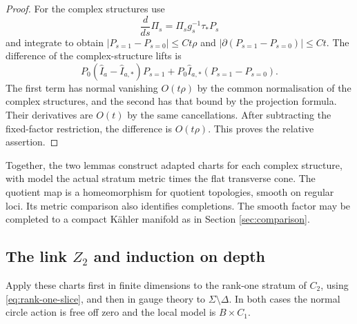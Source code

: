 \begin{proof}
For the complex structures use
\[
 \frac{d}{ds}\Pi_s=\Pi_sg_s^{-1}\tau_*P_s
\]
and integrate to obtain
$|P_{s=1}-P_{s=0}|\le Ct\rho$ and
$|\partial(P_{s=1}-P_{s=0})|\le Ct$. The difference of
the complex-structure lifts is
\[
 P_0(\widehat I_a-\widehat I_{a,*})P_{s=1}
       +P_0\widehat I_{a,*}(P_{s=1}-P_{s=0}).
\]
The first term has normal vanishing $O(t\rho)$ by the
common normalisation of the complex structures, and the second
has that bound by the projection formula. Their derivatives are
$O(t)$ by the same cancellations. After subtracting the
fixed-factor restriction, the difference is $O(t\rho)$.
This proves the relative assertion.
\end{proof}

Together, the two lemmas construct adapted charts for each complex
structure, with model the actual stratum metric times the flat
transverse cone. The quotient map is a homeomorphism for quotient
topologies, smooth on regular loci. Its metric comparison also
identifies completions. The smooth factor may be completed to a
compact K\"ahler manifold as in Section \ref{sec:comparison}.

\subsection{The link $Z_2$ and induction on depth}\label{ss:link-induction}
Apply these charts first in finite dimensions to the rank-one
stratum of $C_2$, using \eqref{eq:rank-one-slice}, and then in
gauge theory to $\Sigma\setminus\Delta$. In both cases the
normal circle action is free off zero and the local model is
$B\times C_1$.


